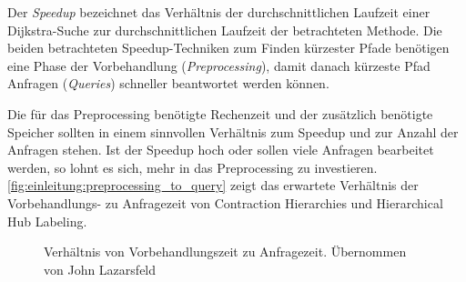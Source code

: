 Der \emph{Speedup} bezeichnet das Verhältnis der durchschnittlichen Laufzeit einer Dijkstra-Suche zur durchschnittlichen Laufzeit der betrachteten Methode.
Die beiden betrachteten Speedup-Techniken zum Finden kürzester Pfade benötigen eine Phase der Vorbehandlung (\emph{Preprocessing}), damit danach kürzeste Pfad Anfragen (\emph{Queries}) schneller beantwortet werden können.

Die für das Preprocessing benötigte Rechenzeit und der zusätzlich benötigte Speicher sollten in einem sinnvollen Verhältnis zum Speedup und zur Anzahl der Anfragen stehen.
Ist der Speedup hoch oder sollen viele Anfragen bearbeitet werden, so lohnt es sich, mehr in das Preprocessing zu investieren.
\autoref{fig:einleitung:preprocessing_to_query} zeigt das erwartete Verhältnis der Vorbehandlungs- zu Anfragezeit von Contraction Hierarchies und Hierarchical Hub Labeling.

\begin{figure}[h!]
  \centering
  \caption{Verhältnis von Vorbehandlungszeit zu Anfragezeit. Übernommen von John Lazarsfeld\cite{Lazarsfeld}}
  \label{fig:einleitung:preprocessing_to_query}
\end{figure}
